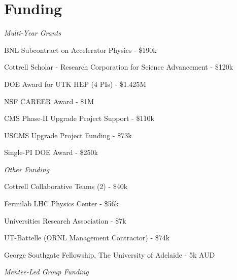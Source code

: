 \documentclass[11pt,letterpaper]{article}
\begin{document}
\section*{Funding}

\emph{Multi-Year Grants}

  \begin{itemizetighter}
    \item BNL Subcontract on Accelerator Physics - \$190k 
    \item Cottrell Scholar - Research Corporation for Science Advancement - \$120k 
    \item DOE Award for UTK HEP (4 PIs) - \$1.425M 
    \item NSF CAREER Award - \$1M 
    \item CMS Phase-II Upgrade Project Support - \$110k 
    \item USCMS Upgrade Project Funding - \$73k 
    \item Single-PI DOE Award - \$250k 
  \end{itemizetighter}


  \emph{Other Funding}

  \begin{itemizetighter}
    \item Cottrell Collaborative Teams (2) - \$40k
    \item Fermilab LHC Physics Center - \$56k
    \item Universities Research Association - \$7k
    \item UT-Battelle (ORNL Management Contractor) - \$74k 
    \item George Southgate Fellowship, The University of Adelaide - 5k AUD 
  \end{itemizetighter}


  \emph{Mentee-Led Group Funding}
\end{document}
